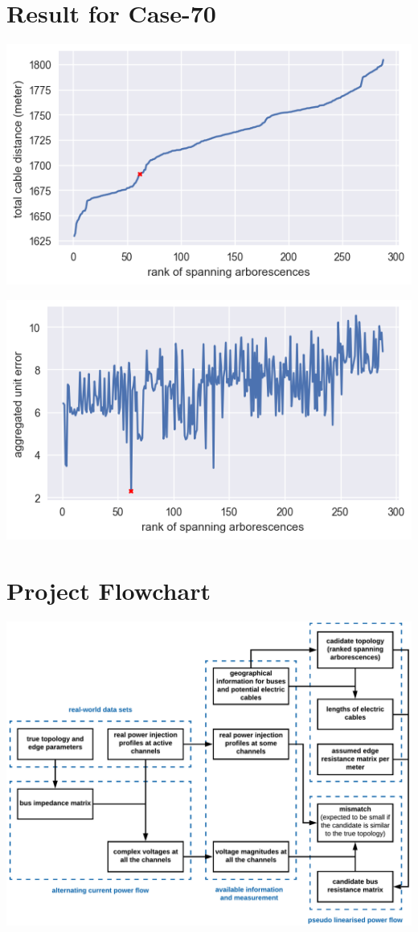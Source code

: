 \documentclass[
]{book}
\begin{document}
\hypertarget{result-for-case-70}{%
\section{Result for Case-70}\label{result-for-case-70}}

\includegraphics{Pictures/distances_288.png}

\includegraphics{Pictures/errors_288.png}

\hypertarget{project-flowchart}{%
\section{Project Flowchart}\label{project-flowchart}}

\includegraphics{Pictures/figFlowchartRotate.png}
\end{document}
